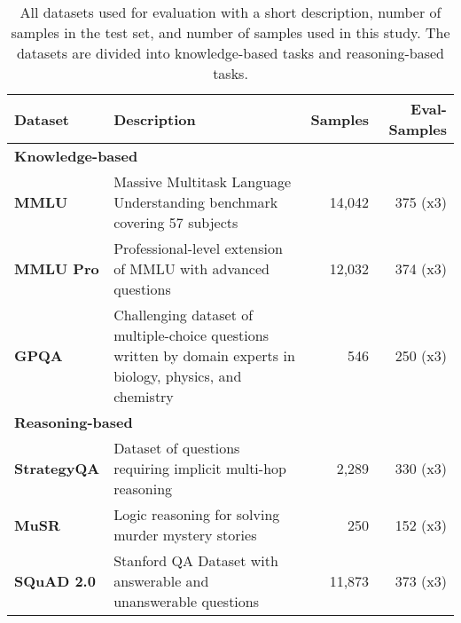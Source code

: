 \begin{table*}[ht!]
\centering
\begin{tabular}{@{}l| p{7cm} |r| r@{}}
\textbf{Dataset} & \textbf{Description} & \textbf{Samples} & \textbf{Eval-Samples} \\
\midrule
\multicolumn{4}{l}{\textbf{Knowledge-based}} \\
\midrule
\textbf{MMLU} & Massive Multitask Language Understanding benchmark covering 57 subjects & 14,042 & 375 (x3) \\
\textbf{MMLU Pro} & Professional-level extension of MMLU with advanced questions & 12,032 & 374 (x3) \\
\textbf{GPQA} & Challenging dataset of multiple-choice questions written by domain experts in biology, physics, and chemistry & 546 & 250 (x3)\\
\midrule
\multicolumn{4}{l}{\textbf{Reasoning-based}} \\
\midrule
\textbf{StrategyQA} & Dataset of questions requiring implicit multi-hop reasoning & 2,289 & 330 (x3)\\
\textbf{MuSR} & Logic reasoning for solving murder mystery stories & 250 & 152 (x3)\\
\textbf{SQuAD 2.0} & Stanford QA Dataset with answerable and unanswerable questions & 11,873 & 373 (x3)\\
\end{tabular}
\caption{All datasets used for evaluation with a short description, number of samples in the test set, and number of samples used in this study. The datasets are divided into knowledge-based tasks and reasoning-based tasks.}
\label{tab:datasets}
\end{table*}
